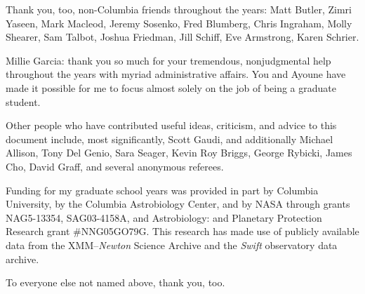 Thank you, too, non-Columbia friends throughout the years: Matt
Butler, Zimri Yaseen, Mark Macleod, Jeremy Sosenko, Fred Blumberg,
Chris Ingraham, Molly Shearer, Sam Talbot, Joshua Friedman, Jill
Schiff, Eve Armstrong, Karen Schrier.

Millie Garcia: thank you so much for your tremendous, nonjudgmental
help throughout the years with myriad administrative affairs.  You and
Ayoune have made it possible for me to focus almost solely on the job
of being a graduate student.

Other people who have contributed useful ideas, criticism, and advice
to this document include, most significantly, Scott Gaudi, and
additionally Michael Allison, Tony Del Genio, Sara Seager, Kevin Roy
Briggs, George Rybicki, James Cho, David Graff, and several anonymous
referees.

Funding for my graduate school years was provided in part by Columbia
University, by the Columbia Astrobiology Center, and by NASA through
grants NAG5-13354, SAG03-4158A, and Astrobiology: and Planetary
Protection Research grant \#NNG05GO79G.  This research has made use of
publicly available data from the XMM--{\it Newton} Science Archive and
the {\it Swift} observatory data archive.

To everyone else not named above, thank you, too.

